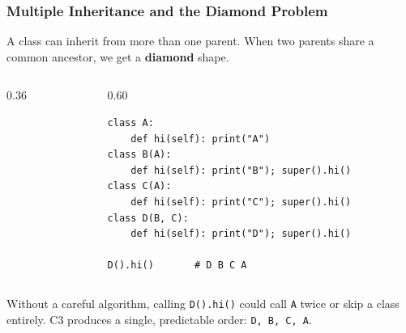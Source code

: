 \documentclass[aspectratio=169,10pt]{beamer}
\newcommand{\keyword}[1]{\textcolor{PrimaryBlue}{\textbf{#1}}}
\newcommand{\codeword}[1]{\texttt{#1}}
\newenvironment{bluebox}[1]{%
  \vspace{0.08cm}\begin{tcolorbox}[lecturebox,title={#1},fontupper=\small]%
}{\end{tcolorbox}\vspace{0.05cm}}
\begin{document}
\begin{frame}[fragile]
\frametitle{Multiple Inheritance and the Diamond Problem}
\small
A class can inherit from more than one parent. When two parents share a common ancestor, we get a \keyword{diamond} shape.

\vspace{0.1cm}
\begin{columns}[T,totalwidth=0.96\textwidth]
\begin{column}{0.36\textwidth}
\begin{center}
\end{center}
\end{column}
\begin{column}{0.60\textwidth}
\begin{lstlisting}[style=pycodesmall]
class A:
    def hi(self): print("A")
class B(A):
    def hi(self): print("B"); super().hi()
class C(A):
    def hi(self): print("C"); super().hi()
class D(B, C):
    def hi(self): print("D"); super().hi()

D().hi()       # D B C A
\end{lstlisting}
\end{column}
\end{columns}

\begin{bluebox}{What C3 prevents}
Without a careful algorithm, calling \codeword{D().hi()} could call \texttt{A} twice or skip a class entirely. C3 produces a single, predictable order: \texttt{D, B, C, A}.
\end{bluebox}
\end{frame}
\end{document}
